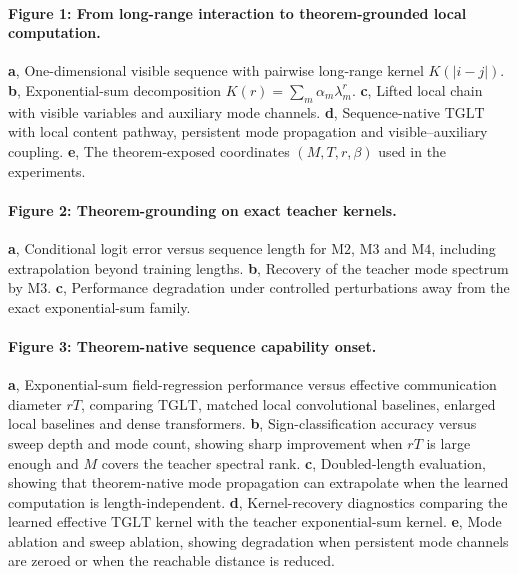 \documentclass[11pt]{article}
\theoremstyle{definition}
\newcommand{\TGLT}{\ensuremath{\mathrm{TGLT}}}
\newcommand{\Mtwo}{\ensuremath{\mathrm{M2}}}
\newcommand{\Mthree}{\ensuremath{\mathrm{M3}}}
\newcommand{\Mfour}{\ensuremath{\mathrm{M4}}}
\begin{document}
\paragraph{Figure 1: From long-range interaction to theorem-grounded local computation.}
\textbf{a}, One-dimensional visible sequence with pairwise long-range kernel \(K(|i-j|)\).
\textbf{b}, Exponential-sum decomposition \(K(r)=\sum_m\alpha_m\lambda_m^r\).
\textbf{c}, Lifted local chain with visible variables and auxiliary mode channels.
\textbf{d}, Sequence-native \TGLT{} with local content pathway, persistent mode propagation and visible--auxiliary coupling.
\textbf{e}, The theorem-exposed coordinates \((M,T,r,\beta)\) used in the experiments.

\paragraph{Figure 2: Theorem-grounding on exact teacher kernels.}
\textbf{a}, Conditional logit error versus sequence length for \Mtwo{}, \Mthree{} and \Mfour{}, including extrapolation beyond training lengths.
\textbf{b}, Recovery of the teacher mode spectrum by \Mthree{}.
\textbf{c}, Performance degradation under controlled perturbations away from the exact exponential-sum family.

\paragraph{Figure 3: Theorem-native sequence capability onset.}
\textbf{a}, Exponential-sum field-regression performance versus effective communication diameter \(rT\), comparing \TGLT{}, matched local convolutional baselines, enlarged local baselines and dense transformers.
\textbf{b}, Sign-classification accuracy versus sweep depth and mode count, showing sharp improvement when \(rT\) is large enough and \(M\) covers the teacher spectral rank.
\textbf{c}, Doubled-length evaluation, showing that theorem-native mode propagation can extrapolate when the learned computation is length-independent.
\textbf{d}, Kernel-recovery diagnostics comparing the learned effective \TGLT{} kernel with the teacher exponential-sum kernel.
\textbf{e}, Mode ablation and sweep ablation, showing degradation when persistent mode channels are zeroed or when the reachable distance is reduced.
\end{document}
